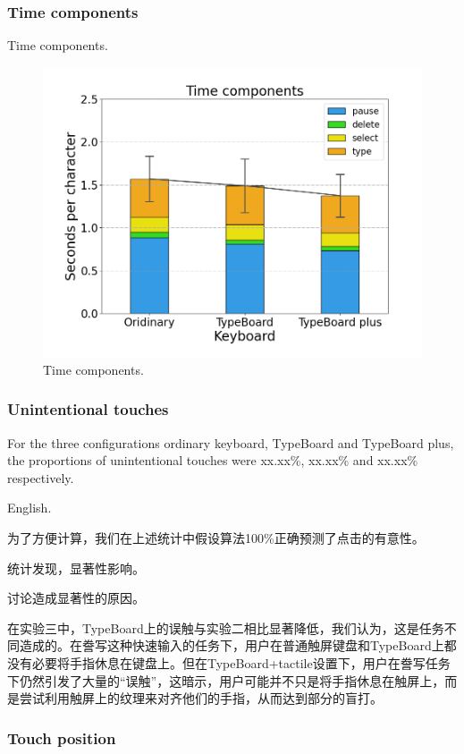 \subsubsection{Time components}

Time components.

\begin{figure}[!tbh]
	\includegraphics[width=0.6\linewidth]{figures/time_components.png}
	\centering
	\caption{Time components.}
	\label{fig:time_components}
\end{figure}

\subsubsection{Unintentional touches}

For the three configurations ordinary keyboard, TypeBoard and TypeBoard plus, the proportions of unintentional touches were xx.xx\%, xx.xx\% and xx.xx\% respectively.

English.

为了方便计算，我们在上述统计中假设算法100\%正确预测了点击的有意性。

统计发现，显著性影响。

讨论造成显著性的原因。

在实验三中，TypeBoard上的误触与实验二相比显著降低，我们认为，这是任务不同造成的。在誊写这种快速输入的任务下，用户在普通触屏键盘和TypeBoard上都没有必要将手指休息在键盘上。但在TypeBoard+tactile设置下，用户在誊写任务下仍然引发了大量的“误触”，这暗示，用户可能并不只是将手指休息在触屏上，而是尝试利用触屏上的纹理来对齐他们的手指，从而达到部分的盲打。

\subsubsection{Touch position}



